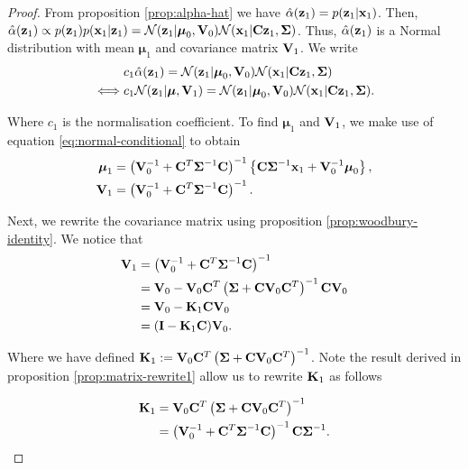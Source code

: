 \documentclass[11pt]{article}
\numberwithin{equation}{section}
\newcommand{\x}{{\bf x}}
\newcommand{\z}{{\bf z}}
\newcommand{\N}{\mathcal{N}}
\begin{document}
\begin{proof}
	From proposition \ref{prop:alpha-hat} we have $\hat\alpha(\z_1) = p(\z_1\vert\x_1)$. Then, $\hat\alpha(\z_1) \propto p(\z_1)p(\x_1\vert\z_1) = \N(\z_1 \vert \boldsymbol\mu_0, {\bf V}_0) \N(\x_1\vert {\bf C}\z_1, \boldsymbol\Sigma)$. Thus, $\hat\alpha(\z_1)$ is a Normal distribution with mean $\boldsymbol{\mu}_1$ and covariance matrix ${\bf V}_1$. We write
	\begin{align}
		&c_1 \hat\alpha(\z_1) = \N(\z_1 \vert \boldsymbol\mu_0, {\bf V}_0) \N(\x_1\vert {\bf C}\z_1, \boldsymbol\Sigma)\\
		\iff& c_1 \N(\z_1\vert \boldsymbol\mu, {\bf V}_1) = \N(\z_1 \vert \boldsymbol\mu_0, {\bf V}_0) \N(\x_1\vert {\bf C}\z_1, \boldsymbol\Sigma).
	\end{align}
	
	Where $c_1$ is the normalisation coefficient. To find $\boldsymbol{\mu}_1$ and ${\bf V}_1$, we make use of equation \eqref{eq:normal-conditional} to obtain
	\begin{align}
		\boldsymbol{\mu}_1 &= \left({\bf V}_0^{-1} + {\bf C}^T\boldsymbol{\Sigma}^{-1} {\bf C}\right)^{-1} \left\{{\bf C}\boldsymbol\Sigma^{-1}\x_1 + {\bf V}_0^{-1}\boldsymbol\mu_0\right\},\\
		{\bf V}_1 &= \left({\bf V}_0^{-1} + {\bf C}^T\boldsymbol{\Sigma}^{-1} {\bf C}\right)^{-1}.
	\end{align}
	
	Next, we rewrite the covariance matrix using proposition \ref{prop:woodbury-identity}. We notice that 
	\begin{align}
		{\bf V}_1 &= \left({\bf V}_0^{-1} + {\bf C}^T\boldsymbol{\Sigma}^{-1} {\bf C}\right)^{-1}\\
		&= {\bf V}_0 - {\bf V}_0 {\bf C}^T\left(\boldsymbol\Sigma + {\bf C}{\bf V}_0{\bf C}^T\right)^{-1}{\bf C}{\bf V}_0 \\
		&= {\bf V}_0 - {\bf K}_1{\bf C}{\bf V}_0\\
		&= ({\bf I} - {\bf K}_1{\bf C}){\bf V}_0. \label{eq:part-v1-rewrite}
	\end{align}
	
	Where we have defined ${\bf K}_1 := {\bf V}_0 {\bf C}^T\left(\boldsymbol\Sigma + {\bf C}{\bf V}_0{\bf C}^T\right)^{-1}$. Note the result derived in proposition \ref{prop:matrix-rewrite1} allow us to rewrite ${\bf K}_1$ as follows
	
	\begin{align}
		{\bf K}_1 &= {\bf V}_0 {\bf C}^T\left(\boldsymbol\Sigma + {\bf C}{\bf V}_0{\bf C}^T\right)^{-1}\\
				  &= \left({\bf V}_0^{-1} + {\bf C}^T \boldsymbol\Sigma^{-1}{\bf C}\right)^{-1}{\bf C}\boldsymbol{\Sigma}^{-1}. \label{eq:part-k1-rewrite}
	\end{align}
	

\end{proof}
\end{document}
